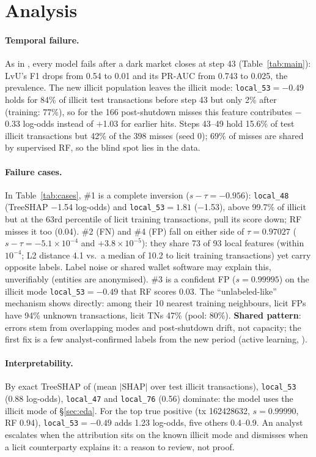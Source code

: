 \documentclass[11pt]{article}
\newcommand{\ours}{LvU}
\begin{document}
\section{Analysis}
\label{sec:analysis}

\paragraph{Temporal failure.}
As in \citet{weber2019aml}, every model fails after a dark market closes at step 43 (Table~\ref{tab:main}): \ours{}'s F1 drops from 0.54 to 0.01 and its PR-AUC from 0.743 to 0.025, the prevalence.
The new illicit population leaves the illicit mode: \texttt{local\_53}$=-0.49$ holds for 84\% of illicit test transactions before step 43 but only 2\% after (training: 77\%), so for the 166 post-shutdown misses this feature contributes $-$0.33 log-odds instead of $+$1.03 for earlier hits.
Steps 43--49 hold 15.6\% of test illicit transactions but 42\% of the 398 misses (seed 0); 69\% of misses are shared by supervised RF, so the blind spot lies in the data.


\paragraph{Failure cases.}
In Table~\ref{tab:cases}, \#1 is a complete inversion ($s-\tau=-0.956$): \texttt{local\_48} (TreeSHAP $-$1.54 log-odds) and \texttt{local\_53}$=1.81$ ($-$1.53), above 99.7\% of illicit but at the 63rd percentile of licit training transactions, pull its score down; RF misses it too (0.04).
\#2 (FN) and \#4 (FP) fall on either side of $\tau=0.97027$ ($s-\tau=-5.1{\times}10^{-4}$ and $+3.8{\times}10^{-5}$): they share 73 of 93 local features (within $10^{-4}$; L2 distance 4.1 vs.\ a median of 10.2 to licit training transactions) yet carry opposite labels.
Label noise or shared wallet software may explain this, unverifiably (entities are anonymised).
\#3 is a confident FP ($s=0.99995$) on the illicit mode \texttt{local\_53}$=-0.49$ that RF scores 0.03.
The ``unlabeled-like'' mechanism shows directly: among their 10 nearest training neighbours, licit FPs have 94\% unknown transactions, licit TNs 47\% (pool: 80\%).
\textbf{Shared pattern}: errors stem from overlapping modes and post-shutdown drift, not capacity; the first fix is a few analyst-confirmed labels from the new period (active learning, \citealp{lorenz2020label}).

\paragraph{Interpretability.}
By exact TreeSHAP of \citet{lundberg2020treeshap} (mean $|$SHAP$|$ over test illicit transactions), \texttt{local\_53} (0.88 log-odds), \texttt{local\_47} and \texttt{local\_76} (0.56) dominate: the model uses the illicit mode of \S\ref{sec:eda}.
For the top true positive (tx 162428632, $s=0.99990$, RF 0.94), \texttt{local\_53}$=-0.49$ adds 1.23 log-odds, five others 0.4--0.9.
An analyst escalates when the attribution sits on the known illicit mode and dismisses when a licit counterparty explains it: a reason to review, not proof.
\end{document}
